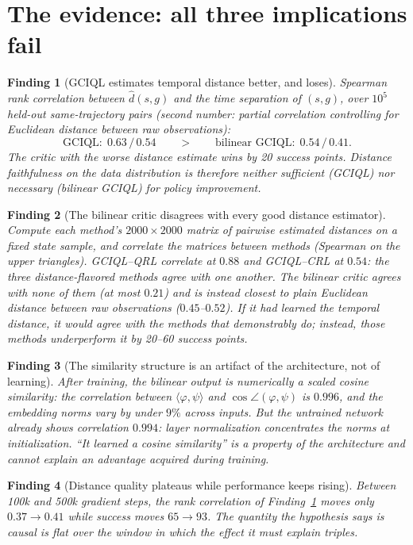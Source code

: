 \documentclass[10pt]{article}
\newtheorem{finding}{Finding}
\newcommand{\ip}[2]{\langle #1, #2 \rangle}
\begin{document}
\section{The evidence: all three implications fail}

\begin{finding}[GCIQL estimates temporal distance better, and loses]\label{f:p1}
Spearman rank correlation between $\hat d(s,g)$ and the time separation of $(s,g)$, over
$10^5$ held-out same-trajectory pairs (second number: partial correlation controlling for
Euclidean distance between raw observations):
\[
\text{GCIQL}:\; 0.63\,/\,0.54 \qquad>\qquad \text{bilinear GCIQL}:\; 0.54\,/\,0.41 .
\]
The critic with the \emph{worse} distance estimate wins by 20 success points. Distance
faithfulness on the data distribution is therefore neither sufficient (GCIQL) nor
necessary (bilinear GCIQL) for policy improvement.
\end{finding}

\begin{finding}[The bilinear critic disagrees with every good distance
estimator]\label{f:rsa}
Compute each method's $2000\times2000$ matrix of pairwise estimated distances on a fixed
state sample, and correlate the matrices between methods (Spearman on the upper
triangles). GCIQL--QRL correlate at $0.88$ and GCIQL--CRL at $0.54$: the three
distance-flavored methods agree with one another. The bilinear critic agrees with none of
them (at most $0.21$) and is instead closest to plain Euclidean distance between raw
observations ($0.45$--$0.52$). If it had learned the temporal distance, it would agree
with the methods that demonstrably do; instead, those methods underperform it by 20--60
success points.
\end{finding}

\begin{finding}[The similarity structure is an artifact of the architecture, not of
learning]\label{f:cos}
After training, the bilinear output is numerically a scaled cosine similarity: the
correlation between $\ip{\varphi}{\psi}$ and $\cos\angle(\varphi,\psi)$ is $0.996$, and
the embedding norms vary by under $9\%$ across inputs. But the \emph{untrained} network
already shows correlation $0.994$: layer normalization concentrates the norms at
initialization. ``It learned a cosine similarity'' is a property of the architecture and
cannot explain an advantage acquired during training.
\end{finding}

\begin{finding}[Distance quality plateaus while performance keeps rising]\label{f:time}
Between 100k and 500k gradient steps, the rank correlation of Finding~\ref{f:p1} moves
only $0.37\to0.41$ while success moves $65\to93$. The quantity the hypothesis says is
causal is flat over the window in which the effect it must explain triples.
\end{finding}
\end{document}
